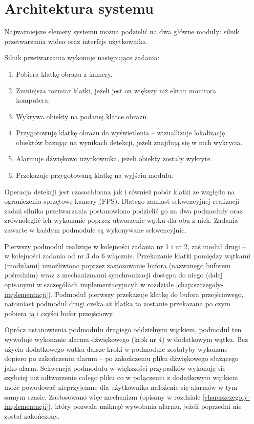 \section{Architektura systemu}
\label{chap:architektura}
Najważniejsze elemety systemu można podzielić na dwa główne moduły: silnik przetwarzania wideo oraz interfejs użytkownika. 

Silnik przetwarzania wykonuje następujące zadania:
\begin{enumerate}
    \item Pobiera klatkę obrazu z kamery.
    \item Zmniejsza rozmiar klatki, jeżeli jest on większy niż ekran monitora komputera.
    \item Wykrywa obiekty na podanej klatce obrazu.
    \item Przygotowuję klatkę obrazu do wyświetlenia -- wizuallizuje lokalizację obiektów bazując na wynikach detekcji, jeżeli znajdują się w nich wykrycia.
    \item Alarmuje dźwiękowo użytkownika, jeżeli obiekty zostały wykryte.
    \item Przekazuje przygotowaną klatkę na wyjściu modułu. 
\end{enumerate}

Operacja detekcji jest czasochłonna jak i również pobór klatki ze względu na ograniczenia sprzętowe kamery (FPS). Dlatego zamiast sekwencyjnej realizacji zadań silnika przetwarzania postanowiono podzielić go na dwa podmoduły oraz zrównoleglić ich wykonanie poprzez utworzenie wątku dla obu z nich. Zadania zawarte w każdym podmodule są wykonywane sekwencyjnie.

Pierwszy podmoduł realizuje w kolejności zadania nr 1 i nr 2, zaś moduł drugi -- w kolejności zadania od nr 3 do 6 włącznie. Przekazanie klatki pomiędzy wątkami (modułami) umożliwiono poprzez zastosowanie bufora (nazwanego buforem pośrednim) wraz z mechanizmami synchronizacji dostępu do niego (dalej opisanymi w szczegółach implementacyjncyh w rozdziale \ref{chap:szczegoly-implementacji}). Podmoduł pierwszy przekazuje klatkę do bufora przejściowego, natomiast podmoduł drugi czeka aż klatka ta zostanie przekazana po czym pobiera ją i czyści bufor przejściowy. 

Oprócz ustanowienia podmodułu drugiego oddzielnym wątkiem, podmoduł ten wywołuje wykonanie alarmu dźwiękowego (krok nr 4) w dodatkowym wątku. Bez użycia dodatkowego wątku dalsze kroki w podmodule zostałyby wykonane dopiero po zakończeniu alarmu -- po zakończeniu pliku dźwiękowego służącego jako alarm. Sekwencja podmodułu w większości przypadków wykonuję się szybciej niż odtworzenie całego pliku co w połączeniu z dodatkowym wątkiem może powodować nieprzyjemne dla użytkownika nałożenie się alarmów w tym samym czasie. Zastosowano więc mechanizm (opisany w rozdziale \ref{chap:szczegoly-implementacji}), który pozwala uniknąć wywołania alarmu, jeżeli poprzedni nie został zakończony.

